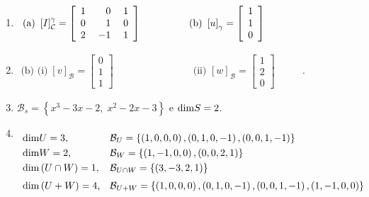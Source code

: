 \documentclass{report}
\renewcommand{\dim}{{\rm dim}}           %
\begin{document}
\begin{enumerate}
\item  $
\begin{array}[b]{llllll}
\text{(a) }\left[ I\right] _{\mathcal{C}}^{\mathcal{\gamma }}=\left[
\begin{array}{rrr}
1 & 0 & \;1 \\
0 & 1 & 0 \\
2 & \;-1 & 1
\end{array}
\right]  &  &  &  &  & \text{(b) }\left[ u\right] _{\gamma }=\left[
\begin{array}{l}
1 \\
1 \\
0
\end{array}
\right]
\end{array}
\qquad \qquad $\qquad

\item  $
\begin{array}{llllll}
\text{(b) (i)}\;\left[ v\right] _{\mathcal{B}}=\left[
\begin{array}{l}
0 \\
1 \\
1
\end{array}
\right]  &  & \qquad  & \qquad  &  & \text{(ii) }\left[ w\right] _{\mathcal{B%
}}=\left[
\begin{array}{l}
1 \\
2 \\
0
\end{array}
\right]
\end{array}
\qquad $ \qquad \qquad \qquad \qquad $.$

\item  $\mathcal{B}_{s}=\left\{ x^{3}-3x-2,\;x^{2}-2x-3\right\} $ e $\dim S=2
$.

\item  $_{
\begin{array}[t]{ll}
\dim U=3\text{,} & \mathcal{B}_{U}=\left\{ \left( 1,0,0,0\right) ,\left(
0,1,0,-1\right) ,\left( 0,0,1,-1\right) \right\} \smallskip  \\
\dim W=2\text{,} & \mathcal{B}_{W}=\left\{ \left( 1,-1,0,0\right) ,\left(
0,0,2,1\right) \right\} \smallskip  \\
\dim \left( U\cap W\right) =1\text{,} & \mathcal{B}_{U\cap W}=\left\{ \left(
3,-3,2,1\right) \right\} \smallskip \smallskip  \\
\dim \left( U+W\right) =4\text{,} & \mathcal{B}_{U+W}=\left\{ \left(
1,0,0,0\right) ,\left( 0,1,0,-1\right) ,\left( 0,0,1,-1\right) ,\left(
1,-1,0,0\right) \right\}
\end{array}
}$\newline


\end{enumerate}
\end{document}
